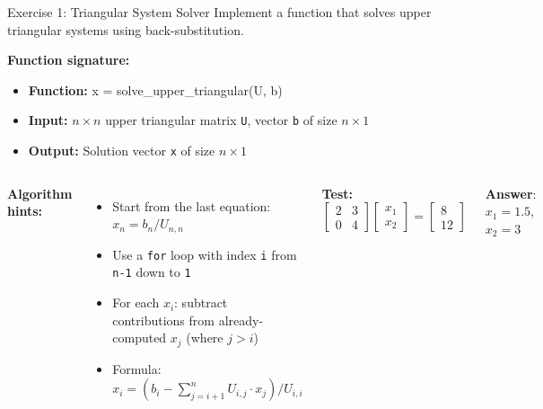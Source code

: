 \documentclass[aspectratio=169]{beamer}
\begin{document}
\begin{frame}{Exercise 1: Triangular System Solver}
	\small{\textcolor{NavyBlue}{Implement a function that solves upper triangular systems using back-substitution.}}
	\vspace{0.2cm}

	\small{
		\textbf{Function signature:}
		\begin{itemize}
			\item[] \textbf{Function:} x = solve\_upper\_triangular(U, b)
			\item[] \textbf{Input:} $n \times n$ upper triangular matrix \texttt{U}, vector \texttt{b} of size $n \times 1$
			\item[] \textbf{Output:} Solution vector \texttt{x} of size $n \times 1$
		\end{itemize}
	}

	\vspace{0.2cm}

	\begin{columns}
		\scriptsize{
			\textbf{Algorithm hints:}
			\begin{itemize}
				\item[] Start from the last equation: $x_n = b_n / U_{n,n}$
				\item[] Use a \texttt{for} loop with index \texttt{i} from \texttt{n-1} down to \texttt{1}
				\item[] For each $x_i$: subtract contributions from already-computed $x_j$ (where $j > i$)
				\item[] Formula: $x_i = (b_i - \sum_{j=i+1}^{n} U_{i,j} \cdot x_j) / U_{i,i}$
			\end{itemize}
		}

		\footnotesize{
			\textbf{Test:} $\begin{bmatrix} 2 & 3 \\ 0 & 4 \end{bmatrix} \begin{bmatrix} x_1 \\ x_2 \end{bmatrix} = \begin{bmatrix} 8 \\ 12 \end{bmatrix}$

			\vspace{0.6cm}
			\textbf{Answer}: $x_1 = 1.5$, $x_2 = 3$
		}
	\end{columns}
\end{frame}
\end{document}

